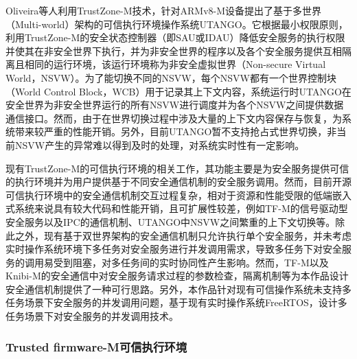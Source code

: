 \documentclass[UTF8,12pt,a4paper,twoside]{ctexart}
\numberwithin{figure}{section}
\begin{document}
\par Oliveira\cite{uTango}等人利用TrustZone-M技术，针对ARMv8-M设备提出了基于多世界（Multi-world）架构的可信执行环境操作系统UTANGO。它根据最小权限原则，利用TrustZone-M的安全状态控制器（即SAU或IDAU）降低安全服务的执行权限并使其在非安全世界下执行，并为非安全世界的程序以及各个安全服务提供互相隔离且相同的运行环境，该运行环境称为非安全虚拟世界（Non-secure Virtual World，NSVW）。为了能切换不同的NSVW，每个NSVW都有一个世界控制块（World Control Block，WCB）用于记录其上下文内容，系统运行时UTANGO在安全世界为非安全世界运行的所有NSVW进行调度并为各个NSVW之间提供数据通信接口。然而，由于在世界切换过程中涉及大量的上下文内容保存与恢复，为系统带来较严重的性能开销。另外，目前UTANGO暂不支持抢占式世界切换，非当前NSVW产生的异常难以得到及时的处理，对系统实时性有一定影响。
\par 现有TrustZone-M的可信执行环境的相关工作，其功能主要是为安全服务提供可信的执行环境并为用户提供基于不同安全通信机制的安全服务调用。然而，目前开源可信执行环境中的安全通信机制交互过程复杂，相对于资源和性能受限的低端嵌入式系统来说具有较大代码和性能开销，且可扩展性较差，例如TF-M的信号驱动型安全服务以及IPC的通信机制、UTANGO中NSVW之间繁重的上下文切换等。除此之外，现有基于双世界架构的安全通信机制只允许执行单个安全服务，并未考虑实时操作系统环境下多任务对安全服务进行并发调用需求，导致多任务下对安全服务的调用易受到阻塞，对多任务间的实时协同性产生影响。然而，TF-M以及Knibi-M的安全通信中对安全服务请求过程的参数检查，隔离机制等为本作品设计安全通信机制提供了一种可行思路。另外，本作品针对现有可信操作系统未支持多任务场景下安全服务的并发调用问题，基于现有实时操作系统FreeRTOS，设计多任务场景下对安全服务的并发调用技术。


\subsubsection{Trusted firmware-M可信执行环境}
\end{document}
